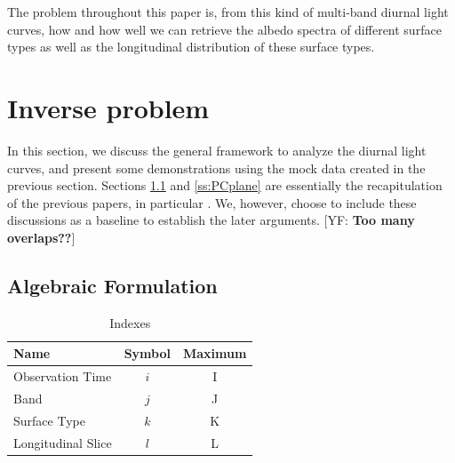 \documentclass[iop,numberedappendix,apj,]{emulateapj}
\def\memoYF#1{\color{red}[YF: {\bf #1}]\color{black}}
\begin{document}
The problem throughout this paper is, from this kind of multi-band diurnal light curves, how and how well we can retrieve the albedo spectra of different surface types as well as the longitudinal distribution of these surface types. 


\section{Inverse problem}
\label{s:frame}

In this section, we discuss the general framework to analyze the diurnal light curves, and present some demonstrations using the mock data created in the previous section. 
Sections \ref{ss:model} and \ref{ss:PCplane} are essentially the recapitulation of the previous papers, in particular \citet{Cowan2013} \citep[but see also][]{Cowan2009,Cowan2011,Fujii2010,Fujii2011}.  
We, however, choose to include these discussions as a baseline to establish the later arguments. 
\memoYF{Too many overlaps??}

\subsection{Algebraic Formulation}
\label{ss:model}


\begin{table}[b]
\caption{Indexes}
\begin{center}
\begin{tabular}{lcc} \hline \hline
Name & Symbol & Maximum \\ \hline
Observation Time & $i$ & I \\
Band & $j$ & J  \\
Surface Type & $k$ & K  \\
Longitudinal Slice  & $l$ & L \\ \hline
\end{tabular}
\end{center}
\label{tab:index}
\end{table}%
\end{document}
